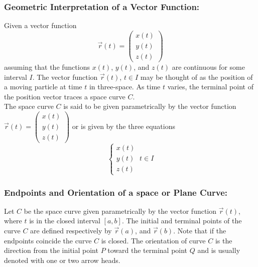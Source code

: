 \documentclass[14pt]{article}
\begin{document}
    \subsubsection{Geometric Interpretation of a Vector Function:}
    Given a vector function $$\vec{r}(t) = \begin{pmatrix}x(t)\\y(t)\\z(t)\end{pmatrix}$$
    assuming that the functions $x(t)$, $y(t)$, and $z(t)$ are continuous for some interval $I$. The vector function $\vec{r}(t)$, $t\in I$ may be thought of as the position of a moving particle at time $t$ in three-space. As time $t$ varies, the terminal point of the position vector traces a space curve $C$.\\ 
    The space curve $C$ is said to be given parametrically by the vector function $\vec{r}(t)=\left(\begin{smallmatrix}x(t)\\y(t)\\z(t)\end{smallmatrix}\right)$ or is given by the three equations
    $$ \left\{
    \begin{array}{lr}
        x(t)\\
        y(t)\\
        z(t)
    \end{array}
    \right.\ t\in I$$
    \subsubsection{Endpoints and Orientation of a space or Plane Curve:}
    Let $C$ be the space curve given parametrically by the vector function $\vec{r}(t)$, where $t$ is in the closed interval $[a,b]$. The initial and terminal points of the curve $C$ are defined respectively by $\vec{r}(a)$, and $\vec{r}(b)$. Note that if the endpoints coincide the curve $C$ is closed. The orientation of curve $C$ is the direction from the initial point $P$ toward the terminal point $Q$ and is usually denoted with one or two arrow heads.\\\\
\end{document}
